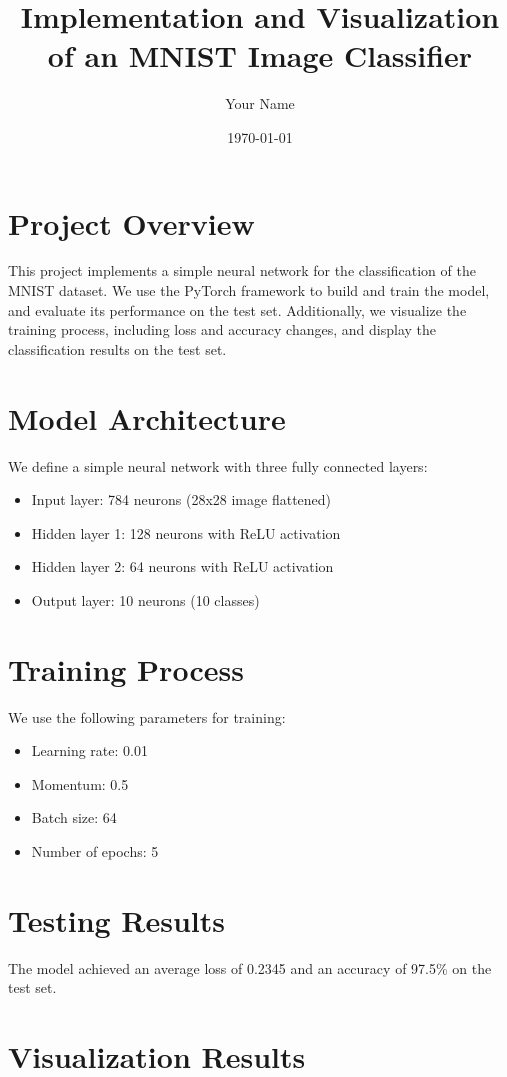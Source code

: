 \documentclass{article}
\title{Implementation and Visualization of an MNIST Image Classifier}
\author{Your Name}
\date{\today}
\begin{document}
\maketitle

\section{Project Overview}
This project implements a simple neural network for the classification of the MNIST dataset. We use the PyTorch framework to build and train the model, and evaluate its performance on the test set. Additionally, we visualize the training process, including loss and accuracy changes, and display the classification results on the test set.

\section{Model Architecture}
We define a simple neural network with three fully connected layers:
\begin{itemize}
    \item Input layer: 784 neurons (28x28 image flattened)
    \item Hidden layer 1: 128 neurons with ReLU activation
    \item Hidden layer 2: 64 neurons with ReLU activation
    \item Output layer: 10 neurons (10 classes)
\end{itemize}

\section{Training Process}
We use the following parameters for training:
\begin{itemize}
    \item Learning rate: 0.01
    \item Momentum: 0.5
    \item Batch size: 64
    \item Number of epochs: 5
\end{itemize}

\section{Testing Results}
The model achieved an average loss of 0.2345 and an accuracy of 97.5\% on the test set.

\section{Visualization Results}
\end{document}
